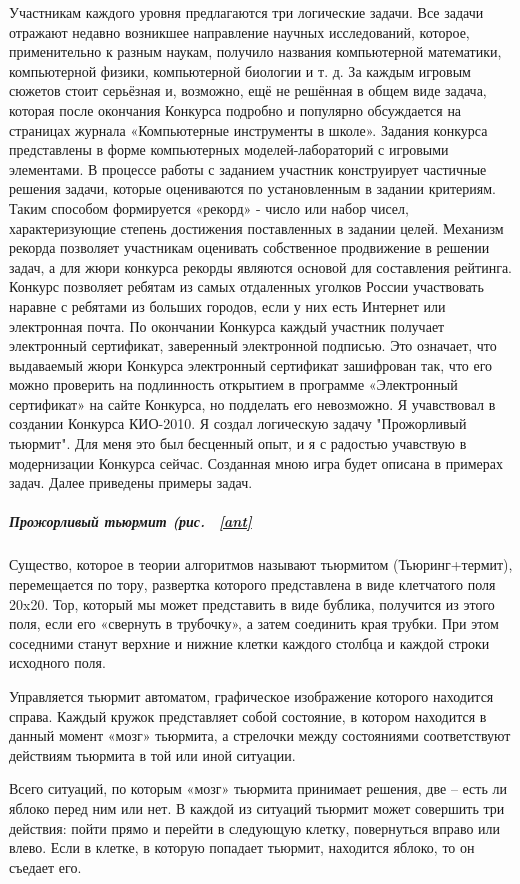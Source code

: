 Участникам каждого уровня предлагаются три логические задачи. Все задачи отражают недавно возникшее направление научных исследований, которое, применительно к разным наукам, получило названия компьютерной математики, компьютерной физики, компьютерной биологии и т. д. За каждым игровым сюжетов стоит серьёзная и, возможно, ещё не решённая в общем виде задача, которая после окончания Конкурса подробно и популярно обсуждается на страницах журнала «Компьютерные инструменты в школе».
Задания конкурса представлены в форме компьютерных моделей-лабораторий с игровыми элементами. В процессе работы с заданием участник конструирует частичные решения задачи, которые оцениваются по установленным в задании критериям. Таким способом формируется «рекорд» - число или набор чисел, характеризующие степень достижения поставленных в задании целей. Механизм рекорда позволяет участникам оценивать собственное продвижение в решении задач, а для жюри конкурса рекорды являются основой для составления рейтинга. 
Конкурс позволяет ребятам из самых отдаленных уголков России участвовать наравне с ребятами из больших городов, если у них есть Интернет или электронная почта. 
По окончании Конкурса каждый участник получает электронный сертификат, заверенный электронной подписью. Это означает, что выдаваемый жюри Конкурса электронный сертификат зашифрован так, что его можно проверить на подлинность открытием в программе «Электронный сертификат» на сайте Конкурса, но подделать его невозможно.
Я учавствовал в создании Конкурса КИО-2010. Я создал логическую задачу "Прожорливый тьюрмит". Для меня это был бесценный опыт, и я с радостью учавствую в модернизации Конкурса сейчас. Созданная мною игра будет описана в примерах задач.
Далее приведены примеры задач.
\subparagraph{Прожорливый тьюрмит (рис. ~\ref{ant}}
Существо, которое в теории алгоритмов называют тьюрмитом (Тьюринг+термит), перемещается по тору, развертка которого представлена в виде клетчатого поля 20x20. Тор, который мы может представить в виде бублика, получится из этого поля, если его «свернуть в трубочку», а затем соединить края трубки. При этом соседними станут верхние и нижние клетки каждого столбца и каждой строки исходного поля.

Управляется тьюрмит автоматом, графическое  изображение которого находится справа. Каждый кружок представляет собой состояние, в котором находится в данный момент «мозг» тьюрмита, а стрелочки между состояниями соответствуют действиям тьюрмита в той или иной ситуации.

Всего ситуаций, по которым «мозг» тьюрмита принимает решения, две – есть ли яблоко перед ним или нет. В каждой из ситуаций тьюрмит может совершить три действия: пойти прямо и перейти в следующую клетку, повернуться вправо или влево. Если в клетке, в которую попадает тьюрмит, находится яблоко, то он съедает его.

